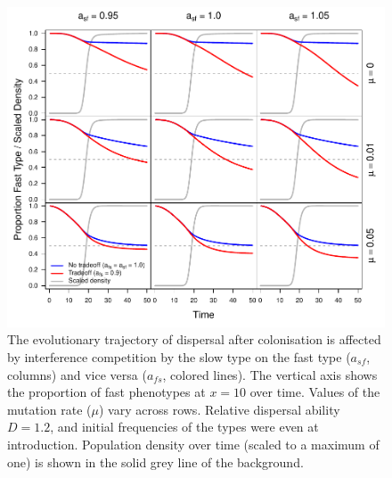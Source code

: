 \documentclass[11pt]{article}
\begin{document}
\newpage
\begin{figure}[!ht]
\begin{center}
\includegraphics[width=6.5in]{../output/time_afs.pdf}
\end{center}
\caption{
The evolutionary trajectory of dispersal after colonisation is affected by interference competition by the slow type on the fast type ($a_{sf}$, columns) and vice versa ($a_{fs}$, colored lines). The vertical axis shows the proportion of fast phenotypes at $x=10$ over time. Values of the mutation rate ($\mu$) vary across rows. Relative dispersal ability $D=1.2$, and initial frequencies of the types were even at introduction. Population density over time (scaled to a maximum of one) is shown in the solid grey line of the background. 
}
\label{ftime_afs}
\end{figure}
\end{document}
